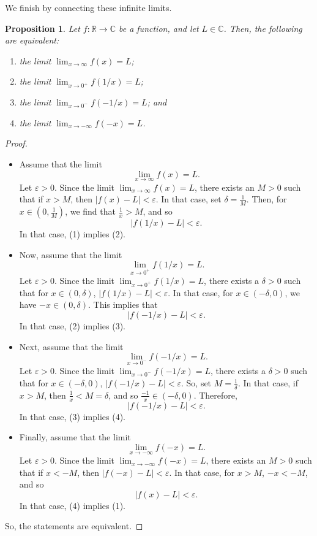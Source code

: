 \documentclass[a4paper, openany]{memoir}
\theoremstyle{definition}
\theoremstyle{plain}
\newtheorem{proposition}[definition]{Proposition}
\begin{document}
We finish by connecting these infinite limits.
\begin{proposition}
Let $f: \mathbb{R} \to \mathbb{C}$ be a function, and let $L \in \mathbb{C}$. Then, the following are equivalent:
\begin{enumerate}[label=(\arabic*)]
    \item the limit $\lim_{x \to \infty} f(x) = L$;
    \item the limit $\lim_{x \to 0^+} f(1/x) = L$;
    \item the limit $\lim_{x \to 0^-} f(-1/x) = L$; and
    \item the limit $\lim_{x \to -\infty} f(-x) = L$.
\end{enumerate}
\end{proposition}
\begin{proof}
\hspace*{0pt}
\begin{itemize}
    \item Assume that the limit
    \[\lim_{x \to \infty} f(x) = L.\]
    Let $\varepsilon > 0$. Since the limit $\lim_{x \to \infty} f(x) = L$, there exists an $M > 0$ such that if $x > M$, then $|f(x) - L| < \varepsilon$. In that case, set $\delta = \frac{1}{M}$. Then, for $x \in (0, \frac{1}{M})$, we find that $\frac{1}{x} > M$, and so
    \[|f(1/x) - L| < \varepsilon.\] 
    In that case, (1) implies (2).
    \item Now, assume that the limit
    \[\lim_{x \to 0^+} f(1/x) = L.\]
    Let $\varepsilon > 0$. Since the limit $\lim_{x \to 0^+} f(1/x) = L$, there exists a $\delta > 0$ such that for $x \in (0, \delta)$, $|f(1/x) - L| < \varepsilon$. In that case, for $x \in (-\delta, 0)$, we have $-x \in (0, \delta)$. This implies that
    \[|f(-1/x) - L| < \varepsilon.\]
    In that case, (2) implies (3).
    \item Next, assume that the limit
    \[\lim_{x \to 0^-} f(-1/x) = L.\]
    Let $\varepsilon > 0$. Since the limit $\lim_{x \to 0^-} f(-1/x) = L$, there exists a $\delta > 0$ such that for $x \in (-\delta, 0)$, $|f(-1/x) - L| < \varepsilon$. So, set $M = \frac{1}{\delta}$. In that case, if $x > M$, then $\frac{1}{x} < M = \delta$, and so $\frac{-1}{x} \in (-\delta, 0)$. Therefore,
    \[|f(-1/x) - L| < \varepsilon.\]
    In that case, (3) implies (4).
    \item Finally, assume that the limit
    \[\lim_{x \to -\infty} f(-x) = L.\]
    Let $\varepsilon > 0$. Since the limit $\lim_{x \to -\infty} f(-x) = L$, there exists an $M > 0$ such that if $x < -M$, then $|f(-x) - L| < \varepsilon$. In that case, for $x > M$, $-x < -M$, and so
    \[|f(x) - L| < \varepsilon.\]
    In that case, (4) implies (1).
\end{itemize}
So, the statements are equivalent.
\end{proof}
\end{document}
